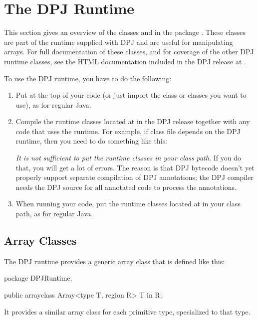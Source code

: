 \section{The DPJ Runtime%
\label{sec:runtime}}

This section gives an overview of the classes  and
 in the package .  These classes are
part of the runtime supplied with DPJ and are useful for manipulating
arrays.  For full documentation of these classes, and for coverage of
the other DPJ runtime classes, see the HTML documentation included in
the DPJ release at .

To use the DPJ runtime, you have to do the following:
%
\begin{enumerate}
%
\item Put  at the top of your code (or just
  import the class or classes you want to use), as for regular Java.
%
\item Compile the runtime classes located at
   in the DPJ release together with
  any code that uses the runtime.  For example, if class file
   depends on the DPJ runtime, then you need to do
  something like this:
%
%
\emph{It is not sufficient to put the runtime classes in your class
  path.}  If you do that, you will get a lot of errors.  The reason is
that DPJ bytecode doesn't yet properly support separate compilation of
DPJ annotations; the DPJ compiler needs the DPJ source for all
annotated code to process the annotations.
%
\item When running your code, put the runtime classes located at
   in your class path, as for
  regular Java.
%
\end{enumerate}

\subsection{Array Classes%
\label{sec:runtime:array}}

The DPJ runtime provides a generic array class  that is
defined like this:
%
\begin{dpjlisting}
package DPJRuntime;

public arrayclass Array<type T, region R> {
  T in R;
}
\end{dpjlisting}
%
It provides a similar array class for each primitive type, specialized
to that type.

